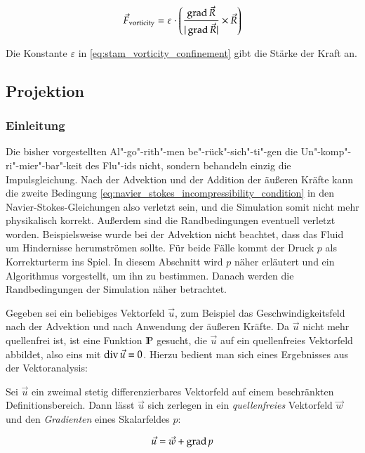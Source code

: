 \begin{equation}
\label{eq:stam_vorticity_confinement}
\vec{F}_{\textnormal{vorticity}}
=
\varepsilon \cdot
\left(
	\frac
	{
		\operatorname*{grad} \vec{R}
	}
	{
		|\operatorname*{grad} \vec{R}|
	}
	\times
	\vec{R}
\right)
\end{equation}

Die Konstante $\varepsilon$ in \autoref{eq:stam_vorticity_confinement} gibt die
Stärke der Kraft an.

\subsection{Projektion}
\label{sec:stam_projection}

\subsubsection{Einleitung}

Die bisher vorgestellten Al"-go"-rith"-men be"-rück"-sich"-ti"-gen die
Un"-komp"-ri"-mier"-bar"-keit des Flu"-ids nicht, sondern behandeln einzig
die Impulsgleichung. Nach der Advektion und der Addition der äußeren
Kräfte kann die zweite Bedingung
\ref{eq:navier_stokes_incompressibility_condition} in den
Navier-Stokes-Gleichungen also verletzt sein, und die Simulation somit
nicht mehr physikalisch korrekt. Außerdem sind die Randbedingungen
eventuell verletzt worden. Beispielsweise wurde bei der Advektion
nicht beachtet, dass das Fluid um Hindernisse herumströmen sollte. Für
beide Fälle kommt der Druck $p$ als Korrekturterm ins Spiel. In diesem
Abschnitt wird $p$ näher erläutert und ein Algorithmus vorgestellt, um
ihn zu bestimmen. Danach werden die Randbedingungen der Simulation
näher betrachtet.

Gegeben sei ein beliebiges Vektorfeld $\vec{u}$, zum Beispiel das
Geschwindigkeitsfeld nach der Advektion und nach Anwendung der äußeren
Kräfte. Da $\vec{u}$ nicht mehr quellenfrei ist, ist eine Funktion
$\mathbb{P}$ gesucht, die $\vec{u}$ auf ein quellenfreies
Vektorfeld abbildet, also eins mit $\operatorname*{div} \vec{u} = 0$. Hierzu
bedient man sich eines Ergebnisses aus der Vektoranalysis:

\begin{PimiddySatz}
Sei $\vec{u}$ ein zweimal stetig differenzierbares Vektorfeld auf einem
beschränkten Definitionsbereich. Dann lässt $\vec{u}$ sich zerlegen in
ein \emph{quellenfreies} Vektorfeld $\vec{w}$ und den \emph{Gradienten}
eines Skalarfeldes $p$:

\begin{equation}
\label{eq:stam_helmholtz_equation}
\vec{u} = \vec{w} + \operatorname*{grad} p
\end{equation}
\end{PimiddySatz}

